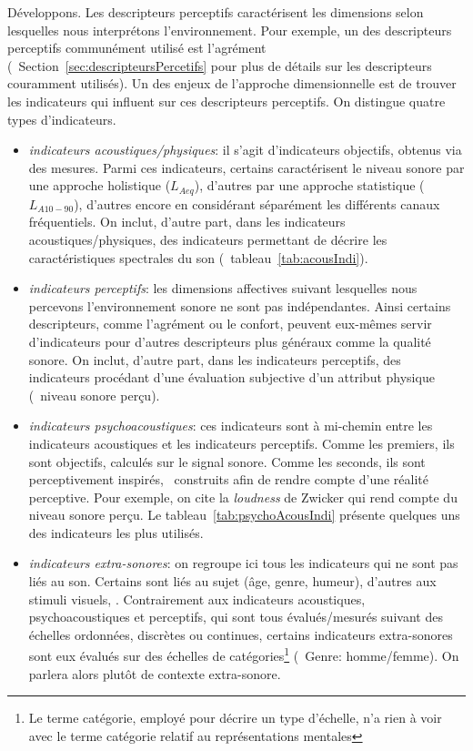 {\begin{itemize}
Développons. Les descripteurs perceptifs caractérisent les dimensions selon lesquelles nous interprétons l'environnement. Pour exemple, un des descripteurs perceptifs communément utilisé est l'agrément (\cf~Section~\ref{sec:descripteursPercetifs} pour plus de détails sur les descripteurs couramment utilisés). 
Un des enjeux de l'approche dimensionnelle est de trouver les indicateurs qui influent sur ces descripteurs perceptifs. On distingue quatre types d'indicateurs.

\begin{itemize}
\item \emph{indicateurs acoustiques/physiques}: il s'agit d'indicateurs objectifs, obtenus via des mesures. Parmi ces indicateurs, certains caractérisent le niveau sonore par une approche holistique ($L_{Aeq}$), d'autres par une approche statistique ($L_{A10-90}$), d'autres encore en considérant séparément les différents canaux fréquentiels. On inclut, d'autre part, dans les indicateurs acoustiques/physiques, des indicateurs permettant de décrire les caractéristiques spectrales du son (\cf~tableau~\ref{tab:acousIndi}).

\item \emph{indicateurs perceptifs}: les dimensions affectives suivant lesquelles nous percevons l'environnement sonore ne sont pas indépendantes. Ainsi certains descripteurs, comme l'agrément ou le confort, peuvent eux-mêmes servir d'indicateurs pour d'autres descripteurs plus généraux comme la qualité sonore. On inclut, d'autre part, dans les indicateurs perceptifs, des indicateurs procédant d'une évaluation subjective d'un attribut physique (\eg~niveau sonore perçu).

\item \emph{indicateurs psychoacoustiques}: ces indicateurs sont à mi-chemin entre les indicateurs acoustiques et les indicateurs perceptifs. Comme les premiers, ils sont objectifs, calculés sur le signal sonore. Comme les seconds, ils sont perceptivement inspirés, \ie~construits afin de rendre compte d'une réalité perceptive. Pour exemple, on cite la \emph{loudness} de Zwicker \citep{zwicker2013psychoacoustics} qui rend compte du niveau sonore perçu. Le tableau~\ref{tab:psychoAcousIndi} présente quelques uns des indicateurs les plus utilisés.

\item \emph{indicateurs extra-sonores}: on regroupe ici tous les indicateurs qui ne sont pas liés au son. Certains sont liés au sujet (âge, genre, humeur), d'autres aux stimuli visuels, . Contrairement aux indicateurs acoustiques, psychoacoustiques et perceptifs, qui sont tous évalués/mesurés suivant des échelles ordonnées, discrètes ou continues, certains indicateurs extra-sonores sont eux évalués sur des échelles de catégories\footnote{Le terme catégorie, employé pour décrire un type d'échelle, n'a rien à voir avec le terme catégorie relatif au représentations mentales} (\eg~Genre: homme/femme). On parlera alors plutôt de contexte extra-sonore.
\end{itemize}


\end{itemize}}
